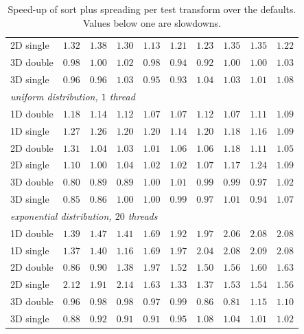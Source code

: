 \begin{table}[p]
\begin{tabular}{lrrrrrrrrr}
        2D single & $1.32$ & $1.38$ & $1.30$ & $1.13$ & $1.21$ & $1.23$ & $1.35$ & $1.35$ & $1.22$ \\
        3D double & $0.98$ & $1.00$ & $1.02$ & $0.98$ & $0.94$ & $0.92$ & $1.00$ & $1.00$ & $1.03$ \\
        3D single & $0.96$ & $0.96$ & $1.03$ & $0.95$ & $0.93$ & $1.04$ & $1.03$ & $1.01$ & $1.08$ \\
        \midrule
        \multicolumn{10}{l}{\emph{uniform distribution, $1$ thread}} \\
        1D double & $1.18$ & $1.14$ & $1.12$ & $1.07$ & $1.07$ & $1.12$ & $1.07$ & $1.11$ & $1.09$ \\
        1D single & $1.27$ & $1.26$ & $1.20$ & $1.20$ & $1.14$ & $1.20$ & $1.18$ & $1.16$ & $1.09$ \\
        2D double & $1.31$ & $1.04$ & $1.03$ & $1.01$ & $1.06$ & $1.06$ & $1.18$ & $1.11$ & $1.05$ \\
        2D single & $1.10$ & $1.00$ & $1.04$ & $1.02$ & $1.02$ & $1.07$ & $1.17$ & $1.24$ & $1.09$ \\
        3D double & $0.80$ & $0.89$ & $0.89$ & $1.00$ & $1.01$ & $0.99$ & $0.99$ & $0.97$ & $1.02$ \\
        3D single & $0.85$ & $0.86$ & $1.00$ & $1.00$ & $0.99$ & $0.97$ & $1.01$ & $0.94$ & $1.07$ \\
        \midrule
        \multicolumn{10}{l}{\emph{exponential distribution, $20$ threads}} \\
        1D double & $1.39$ & $1.47$ & $1.41$ & $1.69$ & $1.92$ & $1.97$ & $2.06$ & $2.08$ & $2.08$ \\
        1D single & $1.37$ & $1.40$ & $1.16$ & $1.69$ & $1.97$ & $2.04$ & $2.08$ & $2.09$ & $2.08$ \\
        2D double & $0.86$ & $0.90$ & $1.38$ & $1.97$ & $1.52$ & $1.50$ & $1.56$ & $1.60$ & $1.63$ \\
        2D single & $2.12$ & $1.91$ & $2.14$ & $1.63$ & $1.33$ & $1.37$ & $1.53$ & $1.54$ & $1.56$ \\
        3D double & $0.96$ & $0.98$ & $0.98$ & $0.97$ & $0.99$ & $0.86$ & $0.81$ & $1.15$ & $1.10$ \\
        3D single & $0.88$ & $0.92$ & $0.91$ & $0.91$ & $0.95$ & $1.08$ & $1.04$ & $1.01$ & $1.02$ \\
        \bottomrule
    \end{tabular}
    \caption{Speed-up of sort plus spreading per test transform over the defaults. Values below one are slowdowns.}
    \label{tab:app_selection_speedup}
\end{table}

